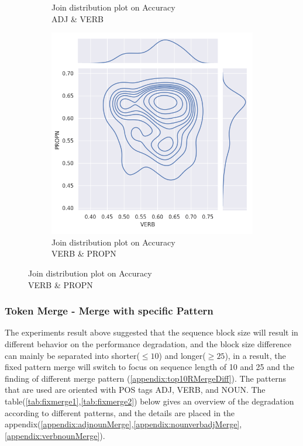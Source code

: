 \documentclass[12pt]{article}
\begin{document}
\begin{figure} [!h]
\begin{subfigure}[h]{0.3\linewidth}
\caption{Join distribution plot on Accuracy\\ADJ \& VERB}
\end{subfigure}
\hfill
\begin{subfigure}[h]{0.3\linewidth}
\includegraphics[width=\linewidth]{figures/merge_verb_propn_joinplot.png}
\caption{Join distribution plot on Accuracy\\VERB \& PROPN}
\label{fig:displot1}
\end{subfigure}
\end{figure}
\newpage
\subsubsection{Token Merge - Merge with specific Pattern }
The experiments result above suggested that the sequence block size will result in different behavior on the performance degradation, and the block size difference can mainly be separated into shorter($\leq10$) and longer($\geq25$), in a result, the fixed pattern merge will switch to focus on sequence length of 10 and 25 and the finding of different merge pattern (\ref{appendix:top10RMergeDiff}). The patterns that are used are oriented with POS tags ADJ, VERB, and NOUN. The table(\ref{tab:fixmerge1},\ref{tab:fixmerge2}) below gives an overview of the degradation according to different patterns, and the details are placed in the appendix(\ref{appendix:adjnounMerge},\ref{appendix:nounverbadjMerge},\ref{appendix:verbnounMerge}).
\end{document}
